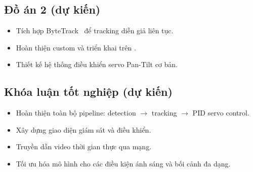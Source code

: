 \subsection{Đồ án 2 (dự kiến)}

\begin{itemize}
    \item Tích hợp ByteTrack~\cite{bytetrack} để tracking diễn giả liên tục.
    \item Hoàn thiện custom \yolo và triển khai trên \rpi.
    \item Thiết kế hệ thống điều khiển servo Pan-Tilt cơ bản.
\end{itemize}

\subsection{Khóa luận tốt nghiệp (dự kiến)}

\begin{itemize}
    \item Hoàn thiện toàn bộ pipeline: detection $\to$ tracking $\to$ PID servo control.
    \item Xây dựng giao diện giám sát và điều khiển.
    \item Truyền dẫn video thời gian thực qua mạng.
    \item Tối ưu hóa mô hình cho các điều kiện ánh sáng và bối cảnh đa dạng.
\end{itemize}
